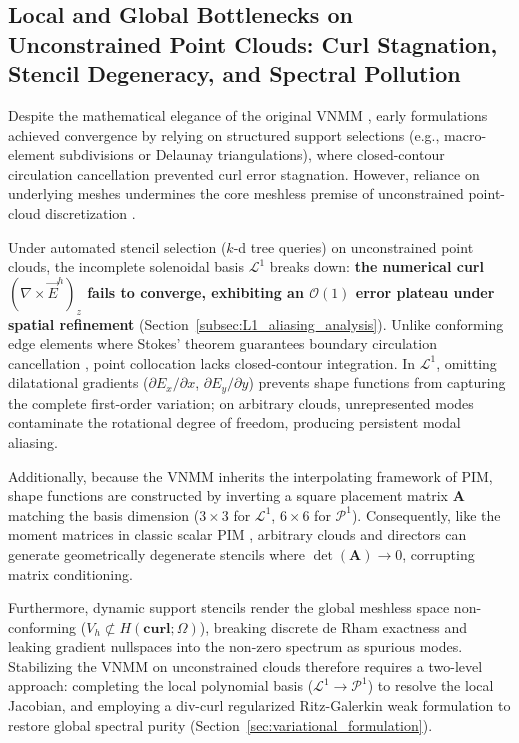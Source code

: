 \documentclass[preprint,12pt]{elsarticle}
\begin{document}
\subsection{Local and Global Bottlenecks on Unconstrained Point Clouds: Curl Stagnation, Stencil Degeneracy, and Spectral Pollution}
\label{subsec:curl_stagnation_bottleneck}

Despite the mathematical elegance of the original VNMM \cite{ortiz2021nodal, ortiz2023tese}, early formulations achieved convergence by relying on structured support selections (e.g., macro-element subdivisions or Delaunay triangulations), where closed-contour circulation cancellation prevented curl error stagnation. However, reliance on underlying meshes undermines the core meshless premise of unconstrained point-cloud discretization \cite{liu2009mesh, goncalves2025tese}.

Under automated stencil selection ($k$-d tree queries) on unconstrained point clouds, the incomplete solenoidal basis $\mathcal{L}^1$ breaks down: \textbf{the numerical curl $(\nabla \times \vec{E}^h)_z$ fails to converge, exhibiting an $\mathcal{O}(1)$ error plateau under spatial refinement} (Section~\ref{subsec:L1_aliasing_analysis}). Unlike conforming edge elements where Stokes' theorem guarantees boundary circulation cancellation \cite{nedelec1980mixed, monk2003finite}, point collocation lacks closed-contour integration. In $\mathcal{L}^1$, omitting dilatational gradients ($\partial E_x/\partial x$, $\partial E_y/\partial y$) prevents shape functions from capturing the complete first-order variation; on arbitrary clouds, unrepresented modes contaminate the rotational degree of freedom, producing persistent modal aliasing.

Additionally, because the VNMM inherits the interpolating framework of PIM, shape functions are constructed by inverting a square placement matrix $\mathbf{A}$ matching the basis dimension ($3 \times 3$ for $\mathcal{L}^1$, $6 \times 6$ for $\mathcal{P}^1$). Consequently, like the moment matrices in classic scalar PIM \cite{liu2001point}, arbitrary clouds and directors can generate geometrically degenerate stencils where $\det(\mathbf{A}) \to 0$, corrupting matrix conditioning.

Furthermore, dynamic support stencils render the global meshless space non-conforming ($V_h \not\subset H(\mathbf{curl}; \Omega)$), breaking discrete de Rham exactness and leaking gradient nullspaces into the non-zero spectrum as spurious modes. Stabilizing the VNMM on unconstrained clouds therefore requires a two-level approach: completing the local polynomial basis ($\mathcal{L}^1 \to \mathcal{P}^1$) to resolve the local Jacobian, and employing a div-curl regularized Ritz-Galerkin weak formulation to restore global spectral purity (Section~\ref{sec:variational_formulation}).
\end{document}
